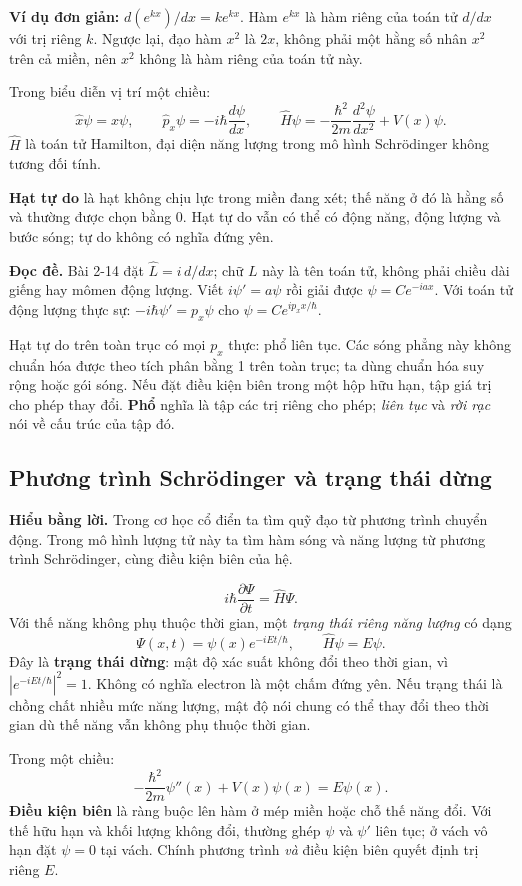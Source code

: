 \documentclass[11pt,a4paper]{article}
\newcommand{\idea}[1]{\par\textbf{Hiểu bằng lời.} #1\par}
\newcommand{\readit}[1]{\par\textbf{Đọc đề.} #1\par}
\begin{document}
\textbf{Ví dụ đơn giản:} $d(e^{kx})/dx=ke^{kx}$.
Hàm $e^{kx}$ là hàm riêng của toán tử $d/dx$ với trị riêng $k$.
Ngược lại, đạo hàm $x^2$ là $2x$, không phải một hằng số nhân $x^2$
trên cả miền, nên $x^2$ không là hàm riêng của toán tử này.

Trong biểu diễn vị trí một chiều:
\[
\hat x\psi=x\psi,\qquad
\hat p_x\psi=-i\hbar\frac{d\psi}{dx},\qquad
\hat H\psi=-\frac{\hbar^2}{2m}\frac{d^2\psi}{dx^2}+V(x)\psi.
\]
$\hat H$ là toán tử Hamilton, đại diện năng lượng trong mô hình
Schrödinger không tương đối tính.

\textbf{Hạt tự do} là hạt không chịu lực trong miền đang xét; thế năng ở đó
là hằng số và thường được chọn bằng 0. Hạt tự do vẫn có thể có động năng,
động lượng và bước sóng; tự do không có nghĩa đứng yên.

\readit{Bài 2-14 đặt $\hat L=i\,d/dx$; chữ $L$ này là tên toán tử,
không phải chiều dài giếng hay mômen động lượng.
Viết $i\psi'=a\psi$ rồi giải được $\psi=Ce^{-iax}$.
Với toán tử động lượng thực sự:
$-i\hbar\psi'=p_x\psi$ cho $\psi=Ce^{ip_xx/\hbar}$.}

Hạt tự do trên toàn trục có mọi $p_x$ thực: phổ liên tục.
Các sóng phẳng này không chuẩn hóa được theo tích phân bằng 1 trên toàn trục;
ta dùng chuẩn hóa suy rộng hoặc gói sóng.
Nếu đặt điều kiện biên trong một hộp hữu hạn, tập giá trị cho phép thay đổi.
\textbf{Phổ} nghĩa là tập các trị riêng cho phép; \emph{liên tục} và
\emph{rời rạc} nói về cấu trúc của tập đó.

\subsection{Phương trình Schrödinger và trạng thái dừng}\label{sec:schrodinger}
\idea{Trong cơ học cổ điển ta tìm quỹ đạo từ phương trình chuyển động.
Trong mô hình lượng tử này ta tìm hàm sóng và năng lượng từ phương trình
Schrödinger, cùng điều kiện biên của hệ.}
\[
i\hbar\frac{\partial\Psi}{\partial t}=\hat H\Psi.
\]
Với thế năng không phụ thuộc thời gian, một \emph{trạng thái riêng năng lượng}
có dạng
\[
\Psi(x,t)=\psi(x)e^{-iEt/\hbar},\qquad
\hat H\psi=E\psi.
\]
Đây là \textbf{trạng thái dừng}: mật độ xác suất không đổi theo thời gian,
vì $|e^{-iEt/\hbar}|^2=1$. Không có nghĩa electron là một chấm đứng yên.
Nếu trạng thái là chồng chất nhiều mức năng lượng, mật độ nói chung có thể
thay đổi theo thời gian dù thế năng vẫn không phụ thuộc thời gian.

Trong một chiều:
\[
-\frac{\hbar^2}{2m}\psi''(x)+V(x)\psi(x)=E\psi(x).
\]
\textbf{Điều kiện biên} là ràng buộc lên hàm ở mép miền hoặc chỗ thế năng đổi.
Với thế hữu hạn và khối lượng không đổi, thường ghép $\psi$ và $\psi'$
liên tục; ở vách vô hạn đặt $\psi=0$ tại vách.
Chính phương trình \emph{và} điều kiện biên quyết định trị riêng $E$.
\end{document}
